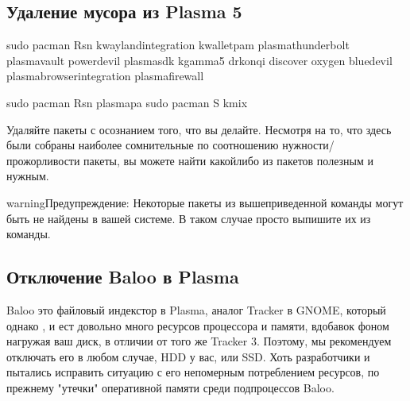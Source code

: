 \documentclass[letterpaper,10pt,russian,openany]{sphinxmanual}
\begin{document}
\subsection{Удаление мусора из Plasma 5}
\label{\detokenize{source/de-optimizations:plasma-5}}\label{\detokenize{source/de-optimizations:plasma-garbage-removal}}\label{\detokenize{source/de-optimizations:index-9}}
\begin{sphinxVerbatim}[commandchars=\\\{\}]
sudo pacman \PYGZhy{}Rsn kwayland\PYGZhy{}integration kwallet\PYGZhy{}pam plasma\PYGZhy{}thunderbolt plasma\PYGZhy{}vault powerdevil plasma\PYGZhy{}sdk kgamma5 drkonqi discover oxygen bluedevil plasma\PYGZhy{}browser\PYGZhy{}integration plasma\PYGZhy{}firewall

sudo pacman \PYGZhy{}Rsn plasma\PYGZhy{}pa     
sudo pacman \PYGZhy{}S kmix            
\end{sphinxVerbatim}

\sphinxAtStartPar
{} Удаляйте пакеты с осознанием того, что вы делайте.
Несмотря на то, что здесь были собраны наиболее сомнительные по соотношению нужности/прожорливости пакеты,
вы можете найти какой\sphinxhyphen{}либо из пакетов полезным и нужным.

\begin{sphinxadmonition}{warning}{Предупреждение:}
\sphinxAtStartPar
Некоторые пакеты из вышеприведенной команды могут быть не найдены в вашей системе.
В таком случае просто выпишите их из команды.
\end{sphinxadmonition}

\ignorespaces 

\subsection{Отключение Baloo в Plasma}
\label{\detokenize{source/de-optimizations:baloo-plasma}}\label{\detokenize{source/de-optimizations:disabling-baloo}}\label{\detokenize{source/de-optimizations:index-10}}
\sphinxAtStartPar
Baloo \sphinxhyphen{} это файловый индекстор в Plasma, аналог Tracker в GNOME, который однако
,
и ест довольно много ресурсов процессора и памяти, вдобавок фоном нагружая ваш диск, в отличии от того же Tracker 3.
Поэтому, мы рекомендуем отключать его в любом случае, HDD у вас, или SSD.
Хоть разработчики и пытались исправить ситуацию с его непомерным потреблением ресурсов,
по прежнему 
"утечки" оперативной памяти среди подпроцессов Baloo.
\end{document}
